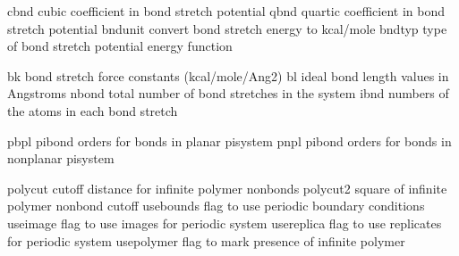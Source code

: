\documentclass[letterpaper,11pt,english]{sphinxmanual}
\begin{document}

\begin{sphinxVerbatim}[commandchars=\\\{\}]
cbnd            cubic coefficient in bond stretch potential
qbnd            quartic coefficient in bond stretch potential
bndunit         convert bond stretch energy to kcal/mole
bndtyp          type of bond stretch potential energy function
\end{sphinxVerbatim}


\begin{sphinxVerbatim}[commandchars=\\\{\}]
bk              bond stretch force constants (kcal/mole/Ang\PYGZca{}2)
bl              ideal bond length values in Angstroms
nbond           total number of bond stretches in the system
ibnd            numbers of the atoms in each bond stretch
\end{sphinxVerbatim}


\begin{sphinxVerbatim}[commandchars=\\\{\}]
pbpl            pi\PYGZhy{}bond orders for bonds in \PYGZdq{}planar\PYGZdq{} pisystem
pnpl            pi\PYGZhy{}bond orders for bonds in \PYGZdq{}nonplanar\PYGZdq{} pisystem
\end{sphinxVerbatim}


\begin{sphinxVerbatim}[commandchars=\\\{\}]
polycut         cutoff distance for infinite polymer nonbonds
polycut2        square of infinite polymer nonbond cutoff
use\PYGZus{}bounds      flag to use periodic boundary conditions
use\PYGZus{}image       flag to use images for periodic system
use\PYGZus{}replica     flag to use replicates for periodic system
use\PYGZus{}polymer     flag to mark presence of infinite polymer
\end{sphinxVerbatim}

\end{document}

